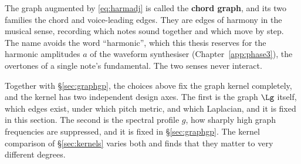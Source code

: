 The graph augmented by \eqref{eq:harmadj} is called the \textbf{chord graph},
and its two families the chord and voice-leading edges. They are edges of
harmony in the musical sense, recording which notes sound together and which
move by step. The name avoids the word ``harmonic'', which this thesis
reserves for the harmonic amplitudes $a$ of the waveform synthesiser
(Chapter~\ref{app:phase3}), the overtones of a single note's fundamental. The
two senses never interact.

Together with \S\ref{sec:graphgp}, the choices above fix the graph kernel
completely, and the kernel has two independent design axes. The first is the
graph $\Lg$ itself, which edges exist, under which pitch metric, and which
Laplacian, and it is fixed in this section. The second is the spectral
profile $g$, how sharply high graph frequencies are suppressed, and it is
fixed in \S\ref{sec:graphgp}. The kernel comparison of \S\ref{sec:kernels}
varies both and finds that they matter to very different degrees.

